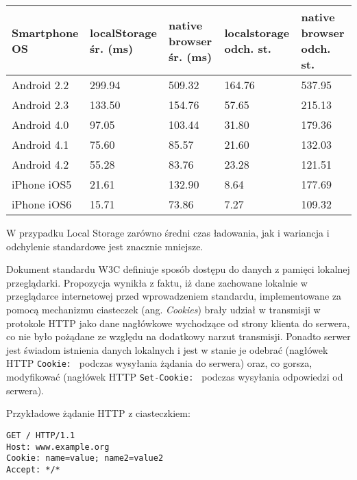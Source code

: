 \begin{center}
    \begin{tabular}{ | l | p{2.5cm} | p{2.5cm} | p{2.5cm} | p{2.5cm} |}
    \hline
	Smartphone OS & localStorage \newline śr. (ms) & native browser \newline śr. (ms) & localstorage \newline odch. st. & native browser \newline odch. st. \\ \hline
	Android 2.2 & 299.94 & 509.32 & 164.76 & 537.95 \\ \hline
	Android 2.3 & 133.50 & 154.76 & 57.65 & 215.13 \\ \hline
	Android 4.0 & 97.05 & 103.44 & 31.80 & 179.36 \\ \hline
	Android 4.1 & 75.60 & 85.57 & 21.60 & 132.03 \\ \hline
	Android 4.2 & 55.28 & 83.76 & 23.28 & 121.51 \\ \hline
	iPhone iOS5 & 21.61 & 132.90 & 8.64 & 177.69 \\ \hline
	iPhone iOS6 & 15.71 & 73.86 & 7.27 & 109.32 \\ \hline
    \hline
    \end{tabular}
\end{center}

W przypadku Local Storage zarówno średni czas ładowania, jak i wariancja i odchylenie standardowe jest znacznie mniejsze.

Dokument standardu W3C\cite{webstorage} definiuje sposób dostępu do danych z pamięci lokalnej przeglądarki. Propozycja wynikła z faktu, iż dane zachowane lokalnie w przeglądarce internetowej przed wprowadzeniem standardu, implementowane za pomocą mechanizmu ciasteczek (ang. \emph{Cookies}) brały udział w transmisji w protokole HTTP jako dane nagłówkowe wychodzące od strony klienta do serwera, co nie było pożądane ze względu na dodatkowy narzut transmisji. Ponadto serwer jest świadom istnienia danych lokalnych i jest w stanie je odebrać (nagłówek HTTP \lstinline{Cookie: } podczas wysyłania żądania do serwera) oraz, co gorsza, modyfikować (nagłówek HTTP \lstinline{Set-Cookie: } podczas wysyłania odpowiedzi od serwera).

Przykładowe żądanie HTTP z ciasteczkiem:
\lstset{language=Octave}
\begin{lstlisting}
GET / HTTP/1.1
Host: www.example.org
Cookie: name=value; name2=value2
Accept: */*
\end{lstlisting}

